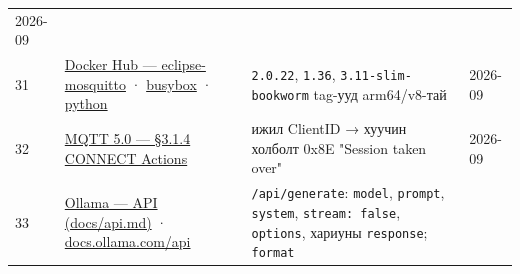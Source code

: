 \begin{longtable}[]{@{}llll@{}}
\begin{minipage}[t]{0.22\columnwidth}
2026-09\strut
\end{minipage}\tabularnewline
\begin{minipage}[t]{0.22\columnwidth}\raggedright
31\strut
\end{minipage} & \begin{minipage}[t]{0.22\columnwidth}\raggedright
\href{https://hub.docker.com/_/eclipse-mosquitto}{Docker Hub --- eclipse-mosquitto} · \href{https://hub.docker.com/_/busybox}{busybox} · \href{https://hub.docker.com/_/python}{python}\strut
\end{minipage} & \begin{minipage}[t]{0.22\columnwidth}\raggedright
\texttt{2.0.22}, \texttt{1.36}, \texttt{3.\allowbreak{}11-slim-bookworm} tag-ууд arm64/v8-тай\strut
\end{minipage} & \begin{minipage}[t]{0.22\columnwidth}\raggedright
2026-09\strut
\end{minipage}\tabularnewline
\begin{minipage}[t]{0.22\columnwidth}\raggedright
32\strut
\end{minipage} & \begin{minipage}[t]{0.22\columnwidth}\raggedright
\href{https://docs.oasis-open.org/mqtt/mqtt/v5.0/os/mqtt-v5.0-os.html}{MQTT 5.\allowbreak{}0 --- §3.\allowbreak{}1.\allowbreak{}4 CONNECT Actions}\strut
\end{minipage} & \begin{minipage}[t]{0.22\columnwidth}\raggedright
ижил ClientID → хуучин холболт 0x8E "Session taken over"\strut
\end{minipage} & \begin{minipage}[t]{0.22\columnwidth}\raggedright
2026-09\strut
\end{minipage}\tabularnewline
\begin{minipage}[t]{0.22\columnwidth}\raggedright
33\strut
\end{minipage} & \begin{minipage}[t]{0.22\columnwidth}\raggedright
\href{https://github.com/ollama/ollama/blob/main/docs/api.md}{Ollama --- API (docs/\allowbreak{}api.\allowbreak{}md)} · \href{https://docs.ollama.com/api/generate}{docs.ollama.com/api}\strut
\end{minipage} & \begin{minipage}[t]{0.22\columnwidth}\raggedright
\texttt{/api/generate}: \texttt{model}, \texttt{prompt}, \texttt{system}, \texttt{stream:\ false}, \texttt{options}, хариуны \texttt{response}; \texttt{format}\strut
\end{minipage} & \begin{minipage}[t]{0.22\columnwidth}\raggedright

\end{minipage}
\end{longtable}
